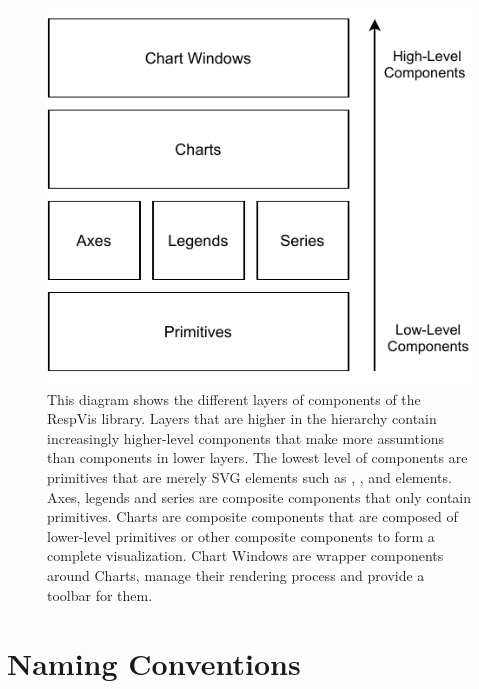 \begin{figure}[tp]
\centering
\includegraphics[keepaspectratio,width=\linewidth,height=\fullh / 3]{diagrams/respvis-layers.pdf}
\caption[Component Layers of RespVis]{
  This diagram shows the different layers of components of the RespVis library.
  Layers that are higher in the hierarchy contain increasingly higher-level components that make more assumtions than components in lower layers.
  The lowest level of components are primitives that are merely SVG elements such as , , and  elements.
  Axes, legends and series are composite components that only contain primitives.
  Charts are composite components that are composed of lower-level primitives or other composite components to form a complete visualization.
  Chart Windows are wrapper components around Charts, manage their rendering process and provide a toolbar for them.  
}
\label{fig:Layers}
\end{figure}

\section{Naming Conventions}
\label{sec:NamingConventions}

